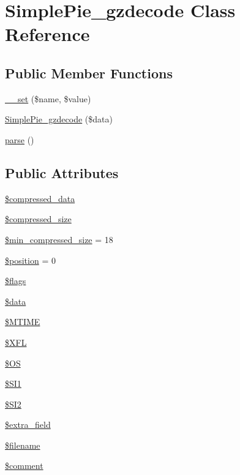 \hypertarget{class_simple_pie__gzdecode}{\section{Simple\-Pie\-\_\-gzdecode Class Reference}
\label{class_simple_pie__gzdecode}
}
\subsection*{Public Member Functions}
\begin{DoxyCompactItemize}
\item 
\hyperlink{class_simple_pie__gzdecode_a188475beeaa8e83cb52228a69b332df0}{\-\_\-\-\_\-set} (\$name, \$value)
\item 
\hyperlink{class_simple_pie__gzdecode_adb383f00509aa4ccee432154848688cf}{Simple\-Pie\-\_\-gzdecode} (\$data)
\item 
\hyperlink{class_simple_pie__gzdecode_a160ce8a679a6130293b0c0d8137fdeaa}{parse} ()
\end{DoxyCompactItemize}
\subsection*{Public Attributes}
\begin{DoxyCompactItemize}
\item 
\hyperlink{class_simple_pie__gzdecode_a37971714e0afe3eff05baf66cf9fbbd6}{\$compressed\-\_\-data}
\item 
\hyperlink{class_simple_pie__gzdecode_ab7b6a04c74c0ccfe1b764f8df5c09b45}{\$compressed\-\_\-size}
\item 
\hyperlink{class_simple_pie__gzdecode_a8f08498db9b83f4cbcfbc5282dc629c7}{\$min\-\_\-compressed\-\_\-size} = 18
\item 
\hyperlink{class_simple_pie__gzdecode_ad5e872a132be02e3551b03e4357d9d50}{\$position} = 0
\item 
\hyperlink{class_simple_pie__gzdecode_a4d077416068dce2c42011ab4a0f110a1}{\$flags}
\item 
\hyperlink{class_simple_pie__gzdecode_ac057ecbb30937a76b16a5defe1c975d4}{\$data}
\item 
\hyperlink{class_simple_pie__gzdecode_ae9d52ef0eb9318025ac65573ca04170c}{\$\-M\-T\-I\-M\-E}
\item 
\hyperlink{class_simple_pie__gzdecode_a174accf279fb3c1f721045db5fdbf06f}{\$\-X\-F\-L}
\item 
\hyperlink{class_simple_pie__gzdecode_a33624266302345cf73d9b111207aafd9}{\$\-O\-S}
\item 
\hyperlink{class_simple_pie__gzdecode_a0aa7d71c5e0b1a53dc39a8e2648a8f7d}{\$\-S\-I1}
\item 
\hyperlink{class_simple_pie__gzdecode_ae1c54f3ff7b41e7598b9744b84f689f6}{\$\-S\-I2}
\item 
\hyperlink{class_simple_pie__gzdecode_a83748c3d50d53d05a206ae8654a8377c}{\$extra\-\_\-field}
\item 
\hyperlink{class_simple_pie__gzdecode_a6ec33376dca9c3833d067a61bf341180}{\$filename}
\item 
\hyperlink{class_simple_pie__gzdecode_ad00744e8cbcecada4304032c4fa07035}{\$comment}
\end{DoxyCompactItemize}


